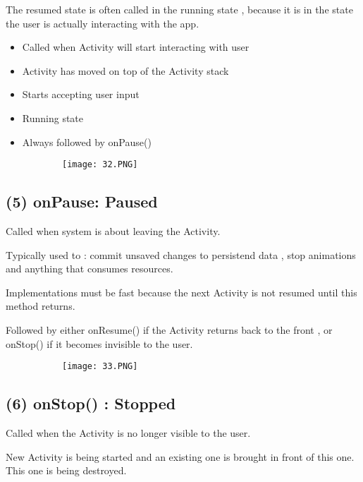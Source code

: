 \documentclass{article}
\begin{document}
The resumed state is often called in the running state , because it is in the state the user is actually interacting with the app.

\begin{itemize}
    \item Called when Activity will start interacting with user
    \item Activity has moved on top of the Activity stack
    \item Starts accepting user input   
    \item Running state
    \item Always followed by onPause()
\end{itemize}

        \begin{figure}[ht!]
  \centering
  \begin{subfigure}[b]{0.5\linewidth}
    \texttt{[image: 32.PNG]}
  \end{subfigure}
  \end{figure}

\subsection{(5) onPause: Paused}

Called when system is about leaving the Activity.

Typically used to : commit unsaved changes to persistend data , stop animations and anything that consumes resources.

Implementations must be fast because the next Activity is not resumed until this method returns.

Followed by either onResume() if the Activity returns back to the front , or onStop() if it becomes invisible to the user.

        \begin{figure}[ht!]
  \centering
  \begin{subfigure}[b]{0.5\linewidth}
    \texttt{[image: 33.PNG]}
  \end{subfigure}
  \end{figure}

  \subsection{(6) onStop() : Stopped}

  Called when the Activity is no longer visible to the user.

  New Activity is being started and an existing one is brought in front of this one. This one is being destroyed.
\end{document}
